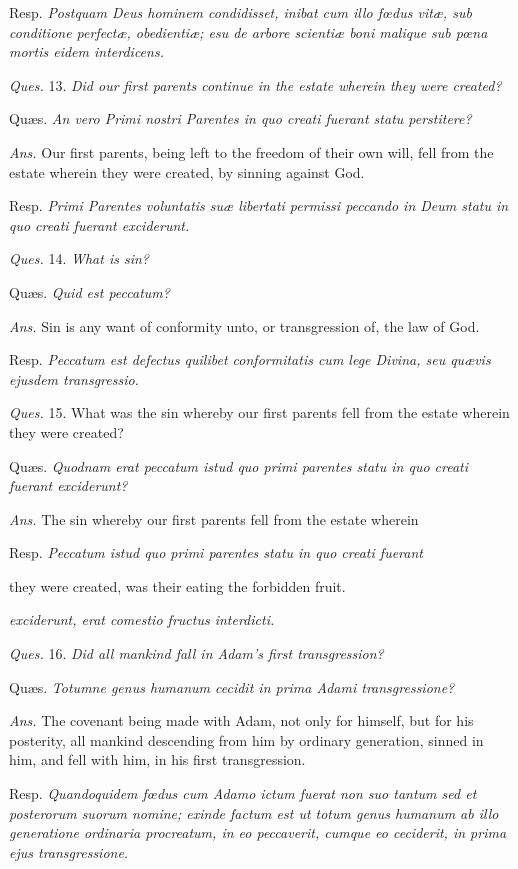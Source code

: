 Resp. \emph{Postquam Deus hominem condidisset, inibat cum illo fœdus vitæ, sub conditione perfectæ, obedientiæ; esu de arbore scientiæ boni malique sub pœna mortis eidem interdicens.}

\emph{Ques.} 13. \emph{Did our first parents continue in the estate wherein they were created?}

Quæs. \emph{An vero Primi nostri Parentes in quo creati fuerant statu perstitere?}

\emph{Ans.} Our first parents, being left to the freedom of their own will, fell from the estate wherein they were created, by sinning against God.

Resp. \emph{Primi Parentes voluntatis suæ libertati permissi peccando in Deum statu in quo creati fuerant exciderunt.}

\emph{Ques.} 14. \emph{What is sin?}

Quæs. \emph{Quid est peccatum?}

\emph{Ans.} Sin is any want of conformity unto, or transgression of, the law of God.

Resp. \emph{Peccatum est defectus quilibet conformitatis cum lege Divina, seu quævis ejusdem transgressio.}

\emph{Ques.} 15. What was the sin whereby our first parents fell from the estate wherein they were created?

Quæs. \emph{Quodnam erat peccatum istud quo primi parentes statu in quo creati fuerant exciderunt?}

\emph{Ans.} The sin whereby our first parents fell from the estate wherein

Resp. \emph{Peccatum istud quo primi parentes statu in quo creati fuerant}

they were created, was their eating the forbidden fruit.

\emph{exciderunt, erat comestio fructus interdicti.}

\emph{Ques.} 16. \emph{Did all mankind fall in Adam's first transgression?}

Quæs. \emph{Totumne genus humanum cecidit in prima Adami transgressione?}

\emph{Ans.} The covenant being made with Adam, not only for himself, but for his posterity, all mankind descending from him by ordinary generation, sinned in him, and fell with him, in his first transgression.

Resp. \emph{Quandoquidem fœdus cum Adamo ictum fuerat non suo tantum sed et posterorum suorum nomine; exinde factum est ut totum genus humanum ab illo generatione ordinaria procreatum, in eo peccaverit, cumque eo ceciderit, in prima ejus transgressione.}

